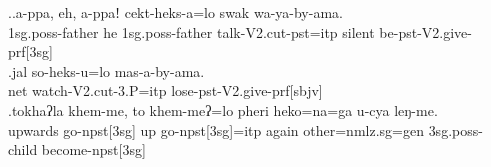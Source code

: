 \ex.\ag.a-ppa,             eh,  a-ppaǃ             cekt-heks-a=lo                   swak  wa-ya-by-ama.\\
{\sc 1sg.poss-}father he {\sc 1sg.poss-}father talk{\sc -V2.cut-pst=itp} silent be{\sc -pst-V2.give-prf[3sg]}\\
 
\bg.jal so-heks-u=lo                  mas-a-by-ama.\\
net watch{\sc -V2.cut-3.P=itp} lose{\sc -pst-V2.give-prf[sbjv]}\\
 
\bg.tokhaʔla khem-me,             to  khem-meʔ=lo           pheri heko=na=ga            u-cya            leŋ-me.\\
upwards go{\sc -npst[3sg]} up go{\sc -npst[3sg]=itp} again other{\sc =nmlz.sg=gen} {\sc 3sg.poss-}child become{\sc -npst[3sg]}\\
 
	
	